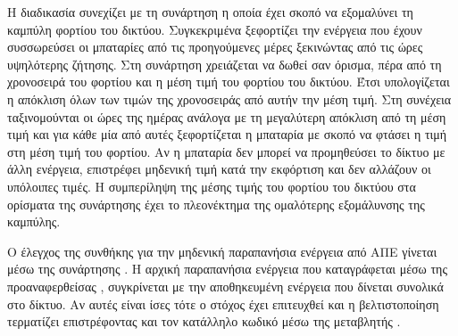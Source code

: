 \documentclass[12pt]{report}
\begin{document}
{}

Η διαδικασία συνεχίζει με τη συνάρτηση {\textbf{{}}} η οποία έχει σκοπό να εξομαλύνει τη καμπύλη φορτίου του δικτύου. Συγκεκριμένα ξεφορτίζει την ενέργεια που έχουν συσσωρεύσει οι μπαταρίες από τις
προηγούμενες μέρες ξεκινώντας από τις ώρες υψηλότερης ζήτησης. Στη συνάρτηση χρειάζεται να δωθεί σαν όρισμα, πέρα από τη χρονοσειρά του φορτίου και η μέση τιμή του φορτίου του δικτύου. Έτσι υπολογίζεται η
απόκλιση όλων των τιμών της χρονοσειράς από αυτήν την μέση τιμή. Στη συνέχεια ταξινομούνται οι ώρες της ημέρας ανάλογα με τη μεγαλύτερη απόκλιση από τη μέση τιμή και για κάθε μία από αυτές ξεφορτίζεται η μπαταρία με σκοπό να 
φτάσει η τιμή στη μέση τιμή του φορτίου. Αν η μπαταρία δεν μπορεί να προμηθεύσει το δίκτυο με άλλη ενέργεια, επιστρέφει μηδενική τιμή κατά την εκφόρτιση και δεν αλλάζουν οι υπόλοιπες τιμές. Η συμπερίληψη της μέσης τιμής του φορτίου
του δικτύου στα ορίσματα της συνάρτησης έχει το πλεονέκτημα της ομαλότερης εξομάλυνσης της καμπύλης.

{}

Ο έλεγχος της συνθήκης για την μηδενική παραπανήσια ενέργεια από ΑΠΕ γίνεται μέσω της συνάρτησης {\textbf{{}}}. Η αρχική παραπανήσια ενέργεια που καταγράφεται μέσω της προαναφερθείσας 
{\textbf{{}}}, συγκρίνεται με την αποθηκευμένη ενέργεια που δίνεται συνολικά στο δίκτυο. Αν αυτές είναι ίσες τότε ο στόχος έχει επιτευχθεί και η βελτιστοποίηση τερματίζει επιστρέφοντας και τον κατάλληλο
κωδικό μέσω της μεταβλητής {}.
\end{document}
